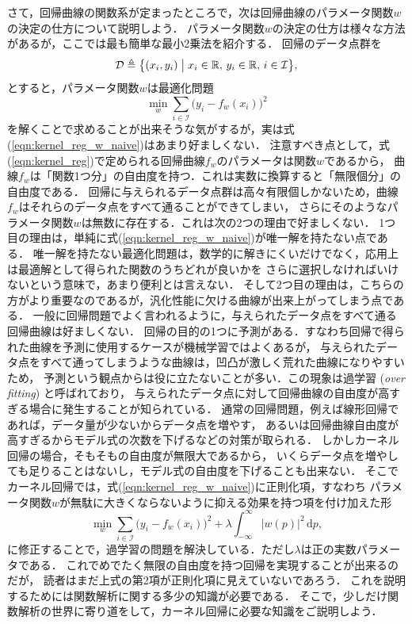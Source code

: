 さて，回帰曲線の関数系が定まったところで，次は回帰曲線のパラメータ関数$w$の決定の仕方について説明しよう．
パラメータ関数$w$の決定の仕方は様々な方法があるが，ここでは最も簡単な最小2乗法を紹介する．
回帰のデータ点群を
\begin{equation}
\mathcal{D} \triangleq \bigl\{
(x_i, y_i) \bigm| x_i \in \mathbb{R}, \, y_i \in \mathbb{R}, \, i \in
\mathcal{I} \bigr\},
\end{equation}
とすると，パラメータ関数$w$は最適化問題
\begin{equation}
\label{eqn:kernel_reg_w_naive}
\min_{w} \sum_{i \in \mathcal{I}}
\bigl( y_i - f_w(x_i) \bigr)^2
\end{equation}
を解くことで求めることが出来そうな気がするが，実は式(\ref{eqn:kernel_reg_w_naive})はあまり好ましくない．
注意すべき点として，式(\ref{eqn:kernel_reg})で定められる回帰曲線$f_w$のパラメータは関数$w$であるから，
曲線$f_w$は「関数1つ分」の自由度を持つ．これは実数に換算すると「無限個分」の自由度である．
回帰に与えられるデータ点群は高々有限個しかないため，曲線$f_w$はそれらのデータ点をすべて通ることができてしまい，
さらにそのようなパラメータ関数$w$は無数に存在する．これは次の2つの理由で好ましくない．
1つ目の理由は，単純に式(\ref{eqn:kernel_reg_w_naive})が唯一解を持たない点である．
唯一解を持たない最適化問題は，数学的に解きにくいだけでなく，応用上は最適解として得られた関数のうちどれが良いかを
さらに選択しなければいけないという意味で，あまり便利とは言えない．
そして2つ目の理由は，こちらの方がより重要なのであるが，汎化性能に欠ける曲線が出来上がってしまう点である．
一般に回帰問題でよく言われるように，与えられたデータ点をすべて通る回帰曲線は好ましくない．
回帰の目的の1つに予測がある．すなわち回帰で得られた曲線を予測に使用するケースが機械学習ではよくあるが，
与えられたデータ点をすべて通ってしまうような曲線は，凹凸が激しく荒れた曲線になりやすいため，
予測という観点からは役に立たないことが多い．この現象は過学習 (\textit{over fitting}) と呼ばれており，
与えられたデータ点に対して回帰曲線の自由度が高すぎる場合に発生することが知られている．
通常の回帰問題，例えば線形回帰であれば，データ量が少ないからデータ点を増やす，
あるいは回帰曲線自由度が高すぎるからモデル式の次数を下げるなどの対策が取られる．
しかしカーネル回帰の場合，そもそもの自由度が無限大であるから，
いくらデータ点を増やしても足りることはないし，モデル式の自由度を下げることも出来ない．
そこでカーネル回帰では，式(\ref{eqn:kernel_reg_w_naive})に正則化項，すなわち
パラメータ関数$w$が無駄に大きくならないように抑える効果を持つ項を付け加えた形
\begin{equation}
\label{eqn:kernel_reg_w}
\min_{w} \sum_{i \in \mathcal{I}} \bigl( y_i - f_w(x_i) \bigr)^2
+ \lambda \int_{-\infty}^{\infty} |w(p)|^2 \, \mathrm{d}p,
\end{equation}
に修正することで，過学習の問題を解決している．ただし$\lambda$は正の実数パラメータである．
これでめでたく無限の自由度を持つ回帰を実現することが出来るのだが，
読者はまだ上式の第2項が正則化項に見えていないであろう．
これを説明するためには関数解析に関する多少の知識が必要である．
そこで，少しだけ関数解析の世界に寄り道をして，カーネル回帰に必要な知識をご説明しよう．

